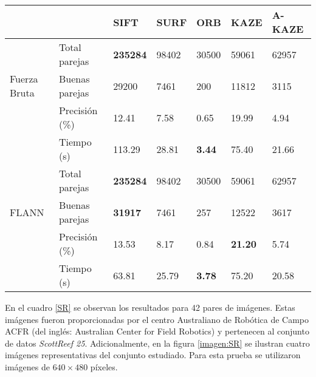 \begin{table}[h]
	\centering
	\label{0234-2}
	\renewcommand{\arraystretch}{0.8}%
	\begin{tabular}{@{}lllllll@{}}
		\toprule
		&                				& SIFT 			& SURF & ORB 			& KAZE 				& A-KAZE \\ \midrule 
		\hfill\vline& Total parejas  & \textbf{235284}  & 98402&30500			& 59061 			& 62957   \\
		Fuerza Bruta \vline& Buenas parejas & 29200		& 7461 & 200 			& 11812 			& 3115    \\
		\hfill\vline& Precisión (\%) & 12.41			&7.58 &0.65 			&19.99 				& 4.94  \\
		\vspace{0.3cm}
		\hfill\vline& Tiempo (s)     & 113.29			&28.81 &\textbf{3.44}	&75.40 				& 21.66  \\
		
		\hfill\vline& Total parejas  & \textbf{235284}  & 98402&30500			& 59061 			& 62957   \\
		FLANN \hfill\vline& Buenas parejas &\textbf{31917}& 7461 & 257 			& 12522				& 3617     \\ 
		\hfill\vline& Precisión (\%) & 13.53			& 8.17& 0.84			& \textbf{21.20}	& 5.74 \\ 
		\hfill\vline& Tiempo (s)     & 63.81			&25.79 &\textbf{3.78} 	&75.20 				& 20.58  \\
		\bottomrule
	\end{tabular}
\end{table}




En el cuadro \ref{SR} se observan los resultados para 42 pares de imágenes. Estas imágenes fueron proporcionadas por el centro Australiano de Robótica de Campo ACFR (del inglés: Australian Center for Field Robotics) y pertenecen al conjunto de datos \textit{ScottReef 25}. Adicionalmente, en la figura \ref{imagen:SR} se ilustran cuatro imágenes representativas del conjunto estudiado. Para esta prueba se utilizaron imágenes de $640\times480$ píxeles.

